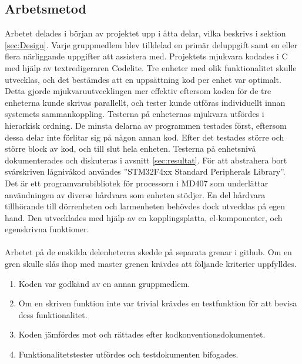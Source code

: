 \subsection{Arbetsmetod}
\label{sec:arbetsmetod}
Arbetet delades i början av projektet upp i åtta delar, vilka beskrivs i sektion \ref{sec:Design}. Varje gruppmedlem blev tilldelad en primär deluppgift samt en eller flera närliggande uppgifter att assistera med. 
\newline \newline
Projektets mjukvara kodades i C med hjälp av textredigeraren Codelite. Tre enheter med olik funktionalitet skulle utvecklas, och det bestämdes att en uppsättning kod per enhet var optimalt. Detta gjorde mjukvaruutvecklingen mer effektiv eftersom koden för de tre enheterna kunde skrivas parallellt, och tester kunde utföras individuellt innan systemets sammankoppling. Testerna på enheternas mjukvara utfördes i hierarkisk ordning. De minsta delarna av programmen testades först, eftersom dessa delar inte förlitar sig på någon annan kod. Efter det testades större och större block av kod, och till slut hela enheten. Testerna på enhetsnivå dokumenterades och diskuteras i avsnitt \ref{sec:resultat}.
\newline \newline
För att abstrahera bort svårskriven lågnivåkod användes ''STM32F4xx Standard Peripherals Library''. Det är ett programvarubibliotek för processorn i MD407 som underlättar användningen av diverse hårdvara som enheten stödjer. En del hårdvara tillhörande till dörrenheten och larmenheten behövdes dock utvecklas på egen hand. Den utvecklades med hjälp av en kopplingsplatta, el-komponenter, och egenskrivna funktioner. 
\\ \\
Arbetet på de enskilda delenheterna skedde på separata grenar i github. Om en gren skulle slås ihop med master grenen krävdes att följande kriterier uppfylldes.
\begin{enumerate}
    \item Koden var godkänd av en annan gruppmedlem.
    \item Om en skriven funktion inte var trivial krävdes en testfunktion för att bevisa dess funktionalitet.
    \item Koden jämfördes mot och rättades efter kodkonventionsdokumentet. 
    \item Funktionalitetstester utfördes och testdokumenten bifogades.
\end{enumerate}

